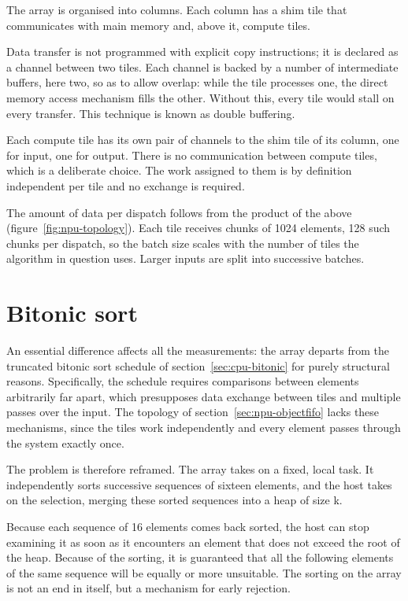 The array is organised into columns. Each column has a shim tile that
communicates with main memory and, above it, compute tiles.

Data transfer is not programmed with explicit copy instructions; it is declared
as a channel between two tiles. Each channel is backed by a number of
intermediate buffers, here two, so as to allow overlap: while the tile
processes one, the direct memory access mechanism fills the other. Without
this, every tile would stall on every transfer. This technique is known as
double buffering.

Each compute tile has its own pair of channels to the shim tile of its column,
one for input, one for output. There is no communication between compute tiles,
which is a deliberate choice. The work assigned to them is by definition
independent per tile and no exchange is required.

The amount of data per dispatch follows from the product of the above
(figure~\ref{fig:npu-topology}). Each tile receives chunks of 1024 elements,
128 such chunks per dispatch, so the batch size scales with the number of tiles
the algorithm in question uses. Larger inputs are split into successive
batches.



\section{Bitonic sort}
\label{sec:npu-bitonic}

An essential difference affects all the measurements: the array departs from
the truncated bitonic sort schedule of section~\ref{sec:cpu-bitonic} for purely
structural reasons. Specifically, the schedule requires comparisons between
elements arbitrarily far apart, which presupposes data exchange between tiles
and multiple passes over the input. The topology of
section~\ref{sec:npu-objectfifo} lacks these mechanisms, since the tiles work
independently and every element passes through the system exactly once.

The problem is therefore reframed. The array takes on a fixed, local task. It
independently sorts successive sequences of sixteen elements, and the host
takes on the selection, merging these sorted sequences into a heap of size k.

Because each sequence of 16 elements comes back sorted, the host can stop
examining it as soon as it encounters an element that does not exceed the root
of the heap. Because of the sorting, it is guaranteed that all the following
elements of the same sequence will be equally or more unsuitable. The sorting
on the array is not an end in itself, but a mechanism for early rejection.

